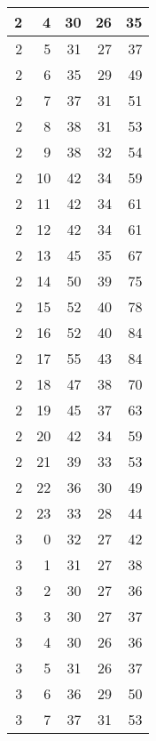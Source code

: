 \begin{longtable}{|r|r|r|r|r|}
    \hline
    2     & 4     & 30    & 26    & 35 \\
    \hline
    2     & 5     & 31    & 27    & 37 \\
    \hline
    2     & 6     & 35    & 29    & 49 \\
    \hline
    2     & 7     & 37    & 31    & 51 \\
    \hline
    2     & 8     & 38    & 31    & 53 \\
    \hline
    2     & 9     & 38    & 32    & 54 \\
    \hline
    2     & 10    & 42    & 34    & 59 \\
    \hline
    2     & 11    & 42    & 34    & 61 \\
    \hline
    2     & 12    & 42    & 34    & 61 \\
    \hline
    2     & 13    & 45    & 35    & 67 \\
    \hline
    2     & 14    & 50    & 39    & 75 \\
    \hline
    2     & 15    & 52    & 40    & 78 \\
    \hline
    2     & 16    & 52    & 40    & 84 \\
    \hline
    2     & 17    & 55    & 43    & 84 \\
    \hline
    2     & 18    & 47    & 38    & 70 \\
    \hline
    2     & 19    & 45    & 37    & 63 \\
    \hline
    2     & 20    & 42    & 34    & 59 \\
    \hline
    2     & 21    & 39    & 33    & 53 \\
    \hline
    2     & 22    & 36    & 30    & 49 \\
    \hline
    2     & 23    & 33    & 28    & 44 \\
    \hline
    3     & 0     & 32    & 27    & 42 \\
    \hline
    3     & 1     & 31    & 27    & 38 \\
    \hline
    3     & 2     & 30    & 27    & 36 \\
    \hline
    3     & 3     & 30    & 27    & 37 \\
    \hline
    3     & 4     & 30    & 26    & 36 \\
    \hline
    3     & 5     & 31    & 26    & 37 \\
    \hline
    3     & 6     & 36    & 29    & 50 \\
    \hline
    3     & 7     & 37    & 31    & 53 \\

\end{longtable}
